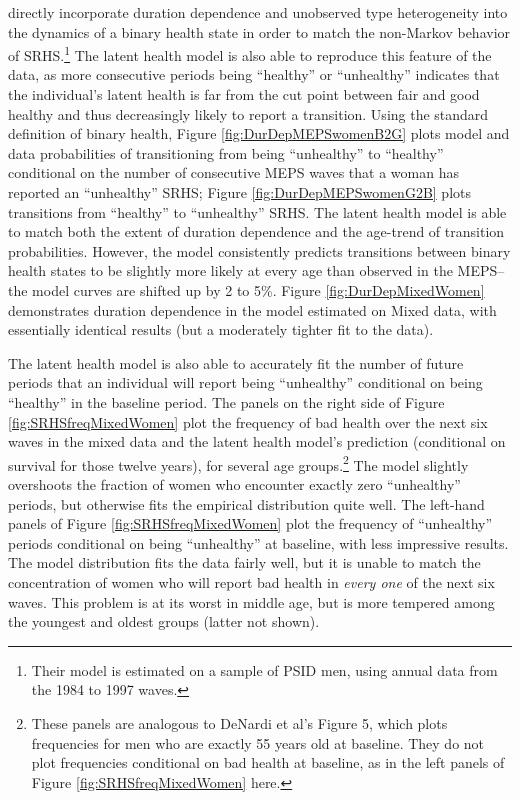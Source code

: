 \documentclass[12pt,pdftex,letterpaper]{article}
\begin{document}
\cite{DeNardi18} directly incorporate duration dependence and unobserved type heterogeneity into the dynamics of a binary health state in order to match the non-Markov behavior of SRHS.\footnote{Their model is estimated on a sample of PSID men, using annual data from the 1984 to 1997 waves.}  The latent health model is also able to reproduce this feature of the data, as more consecutive periods being ``healthy'' or ``unhealthy'' indicates that the individual's latent health is far from the cut point between fair and good healthy and thus decreasingly likely to report a transition.  Using the standard definition of binary health, Figure \ref{fig:DurDepMEPSwomenB2G} plots model and data probabilities of transitioning from being ``unhealthy'' to ``healthy'' conditional on the number of consecutive MEPS waves that a woman has reported an ``unhealthy'' SRHS; Figure \ref{fig:DurDepMEPSwomenG2B} plots transitions from ``healthy'' to ``unhealthy'' SRHS.  The latent health model is able to match both the extent of duration dependence and the age-trend of transition probabilities.  However, the model consistently predicts transitions between binary health states to be slightly more likely at every age than observed in the MEPS-- the model curves are shifted up by 2 to 5\%.  Figure \ref{fig:DurDepMixedWomen} demonstrates duration dependence in the model estimated on Mixed data, with essentially identical results (but a moderately tighter fit to the data).

The latent health model is also able to accurately fit the number of future periods that an individual will report being ``unhealthy'' conditional on being ``healthy'' in the baseline period.  The panels on the right side of Figure \ref{fig:SRHSfreqMixedWomen} plot the frequency of bad health over the next six waves in the mixed data and the latent health model's prediction (conditional on survival for those twelve years), for several age groups.\footnote{These panels are analogous to DeNardi et al's Figure 5, which plots frequencies for men who are exactly 55 years old at baseline.  They do not plot frequencies conditional on bad health at baseline, as in the left panels of Figure \ref{fig:SRHSfreqMixedWomen} here.}  The model slightly overshoots the fraction of women who encounter exactly zero ``unhealthy'' periods, but otherwise fits the empirical distribution quite well.  The left-hand panels of Figure \ref{fig:SRHSfreqMixedWomen} plot the frequency of ``unhealthy'' periods conditional on being ``unhealthy'' at baseline, with less impressive results.  The model distribution fits the data fairly well, but it is unable to match the concentration of women who will report bad health in \textit{every one} of the next six waves.  This problem is at its worst in middle age, but is more tempered among the youngest and oldest groups (latter not shown).
\end{document}
